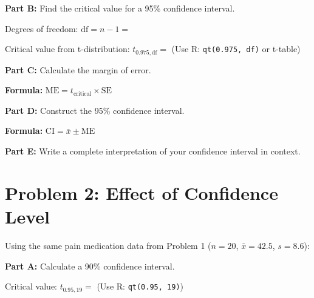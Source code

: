 \documentclass[11pt]{article}
\begin{document}
\vspace{2.5cm}

\textbf{Part B:} Find the critical value for a 95\% confidence interval.

\vspace{0.3cm}

Degrees of freedom: $\text{df} = n - 1 = $

\vspace{0.5cm}

Critical value from t-distribution: $t_{0.975, \text{df}} = $ \hspace{1cm} (Use R: \texttt{qt(0.975, df)} or t-table)

\vspace{2cm}

\textbf{Part C:} Calculate the margin of error.

\vspace{0.3cm}

\textbf{Formula:} $\text{ME} = t_{\text{critical}} \times \text{SE}$

\vspace{2.5cm}

\textbf{Part D:} Construct the 95\% confidence interval.

\vspace{0.3cm}

\textbf{Formula:} $\text{CI} = \bar{x} \pm \text{ME}$

\vspace{2.5cm}

\textbf{Part E:} Write a complete interpretation of your confidence interval in context.

\vspace{3cm}

\newpage

\section{Problem 2: Effect of Confidence Level}

Using the same pain medication data from Problem 1 ($n=20$, $\bar{x}=42.5$, $s=8.6$):

\vspace{6pt}

\textbf{Part A:} Calculate a 90\% confidence interval.

\vspace{0.3cm}

Critical value: $t_{0.95, 19} = $ \hspace{1cm} (Use R: \texttt{qt(0.95, 19)})
\end{document}

